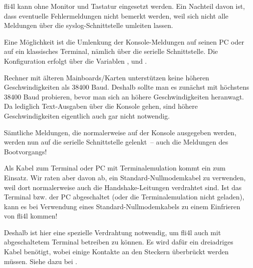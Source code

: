 
    fli4l kann ohne Monitor und Tastatur eingesetzt werden. Ein Nachteil 
    davon ist, dass eventuelle Fehlermeldungen nicht bemerkt werden, weil 
    sich nicht alle Meldungen über die syslog-Schnittstelle umleiten lassen.

    Eine Möglichkeit ist die Umlenkung der Konsole-Meldungen auf seinen PC 
    oder auf ein klassisches Terminal, nämlich über die serielle 
    Schnittstelle. Die Konfiguration erfolgt über die Variablen
    ,
     und
    .

    Rechner mit älteren Mainboards/Karten unterstützen keine höheren 
    Geschwindigkeiten als 38400 Baud. Deshalb sollte man es zunächst mit 
    höchstens 38400 Baud probieren, bevor man sich an höhere Geschwindigkeiten 
    heranwagt. Da lediglich Text-Ausgaben über die Konsole gehen, sind höhere 
    Geschwindigkeiten eigentlich auch gar nicht notwendig.

    Sämtliche Meldungen, die normalerweise auf der Konsole ausgegeben werden, 
    werden nun auf die serielle Schnittstelle gelenkt~-- auch die Meldungen 
    des Bootvorgangs!

    Als Kabel zum Terminal oder PC mit Terminalemulation kommt ein 
     zum Einsatz. Wir raten aber davon ab,
    ein Standard-Nullmodemkabel zu verwenden, weil dort normalerweise auch
    die Handshake-Leitungen verdrahtet sind. Ist das Terminal bzw. der PC
    abgeschaltet (oder die Terminalemulation nicht geladen), kann es bei
    Verwendung eines Standard-Nullmodemkabels zu einem Einfrieren von fli4l
    kommen!

    Deshalb ist hier eine spezielle Verdrahtung notwendig, um fli4l auch mit 
    abgeschaltetem Terminal betreiben zu können. Es wird dafür ein dreiadriges 
    Kabel benötigt, wobei einige Kontakte an den Steckern überbrückt werden 
    müssen. Siehe dazu bei .





